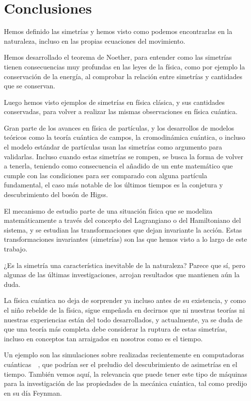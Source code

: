 \chapter{Conclusiones}\label{ch:conclusiones}
Hemos definido las simetrías y hemos visto como podemos encontrarlas en la naturaleza, incluso en las propias ecuaciones del movimiento.

Hemos desarrollado el teorema de Noether, para entender como las simetrías tienen consecuencias muy profundas en las leyes de la física, como por ejemplo la conservación de la energía, al comprobar la relación entre simetrías y cantidades que se conservan.

Luego hemos visto ejemplos de simetrías en física clásica, y sus cantidades conservadas, para volver a realizar las mismas observaciones en física cuántica.

Gran parte de los avances en física de partículas, y los desarrollos de modelos teóricos como la teoría cuántica de campos, la cromodinámica cuántica, o incluso el modelo estándar de partículas usan las simetrías como argumento para validarlas.
Incluso cuando estas simetrías se rompen, se busca la forma de volver a tenerla, teniendo como consecuencia el añadido de un ente matemático que cumple con las condiciones para ser comparado con alguna partícula fundamental, el caso más notable de los últimos tiempos es la conjetura y descubrimiento del bosón de Higss.

El mecanismo de estudio parte de una situación física que se modeliza matemáticamente a través del concepto del Lagrangiano o del Hamiltoniano del sistema, y se estudian las transformaciones que dejan invariante la acción.
Estas transformaciones invariantes (simetrías) son las que hemos visto a lo largo de este trabajo.

¿Es la simetría una característica inevitable de la naturaleza?
Parece que sí, pero algunas de las últimas investigaciones, arrojan resultados que mantienen aún la duda.

La física cuántica no deja de sorprender ya incluso antes de su existencia, y como el niño rebelde de la física, sigue empeñada en decirnos que ni nuestras teorías ni nuestras experiencias están del todo desarrollados, y actualmente, ya se duda de que una teoría más completa debe considerar la ruptura de estas simetrías, incluso en conceptos tan arraigados en nosotros como es el tiempo.

Un ejemplo son las simulaciones sobre  realizadas recientemente en computadoras cuánticas~\cite{TC1}~\cite{TC2}, que podrían ser el preludio del descubrimiento de asimetrías en el tiempo. También vemos aquí, la relevancia que puede tener este tipo de máquinas para la investigación de las propiedades de la mecánica cuántica, tal como predijo en su día Feynman.

